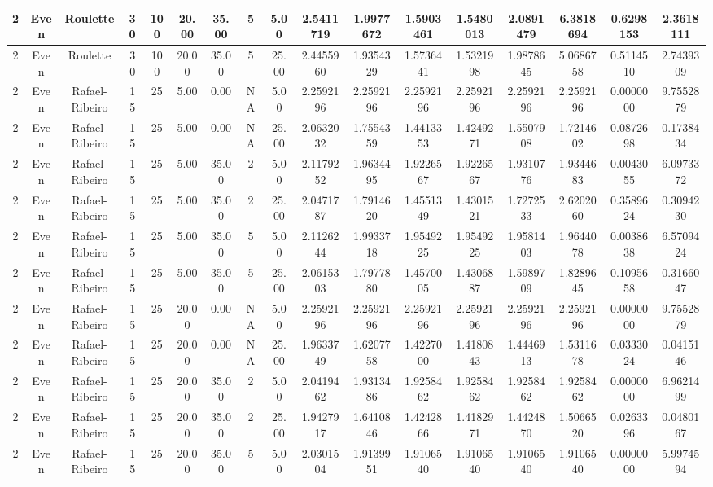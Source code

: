 \begin{longtable}{ | c | c | c | c | c | c | c | c | c | c | c | c | c | c | c | c | c | }
	\hline
	2	&	Even	&	Roulette	&	30	&	100	&	20.00	&	35.00	&	5	&	5.00	&	2.5411719	&	1.9977672	&	1.5903461	&	1.5480013	&	2.0891479	&	6.3818694	&	0.6298153	&	2.3618111 \\
	\hline
	2	&	Even	&	Roulette	&	30	&	100	&	20.00	&	35.00	&	5	&	25.00	&	2.4455960	&	1.9354329	&	1.5736441	&	1.5321998	&	1.9878645	&	5.0686758	&	0.5114510	&	2.7439309 \\
	\hline
	2	&	Even	&	Rafael-Ribeiro	&	15	&	25	&	5.00	&	0.00	&	NA	&	5.00	&	2.2592196	&	2.2592196	&	2.2592196	&	2.2592196	&	2.2592196	&	2.2592196	&	0.0000000	&	9.7552879 \\
	\hline
	2	&	Even	&	Rafael-Ribeiro	&	15	&	25	&	5.00	&	0.00	&	NA	&	25.00	&	2.0632032	&	1.7554359	&	1.4413353	&	1.4249271	&	1.5507908	&	1.7214602	&	0.0872698	&	0.1738434 \\
	\hline
	2	&	Even	&	Rafael-Ribeiro	&	15	&	25	&	5.00	&	35.00	&	2	&	5.00	&	2.1179252	&	1.9634495	&	1.9226567	&	1.9226567	&	1.9310776	&	1.9344683	&	0.0043055	&	6.0973372 \\
	\hline
	2	&	Even	&	Rafael-Ribeiro	&	15	&	25	&	5.00	&	35.00	&	2	&	25.00	&	2.0471787	&	1.7914620	&	1.4551349	&	1.4301521	&	1.7272533	&	2.6202060	&	0.3589624	&	0.3094230 \\
	\hline
	2	&	Even	&	Rafael-Ribeiro	&	15	&	25	&	5.00	&	35.00	&	5	&	5.00	&	2.1126244	&	1.9933718	&	1.9549225	&	1.9549225	&	1.9581403	&	1.9644078	&	0.0038638	&	6.5709424 \\
	\hline
	2	&	Even	&	Rafael-Ribeiro	&	15	&	25	&	5.00	&	35.00	&	5	&	25.00	&	2.0615303	&	1.7977880	&	1.4570005	&	1.4306887	&	1.5989709	&	1.8289645	&	0.1095658	&	0.3166047 \\
	\hline
	2	&	Even	&	Rafael-Ribeiro	&	15	&	25	&	20.00	&	0.00	&	NA	&	5.00	&	2.2592196	&	2.2592196	&	2.2592196	&	2.2592196	&	2.2592196	&	2.2592196	&	0.0000000	&	9.7552879 \\
	\hline
	2	&	Even	&	Rafael-Ribeiro	&	15	&	25	&	20.00	&	0.00	&	NA	&	25.00	&	1.9633749	&	1.6207758	&	1.4227000	&	1.4180843	&	1.4446913	&	1.5311678	&	0.0333024	&	0.0415146 \\
	\hline
	2	&	Even	&	Rafael-Ribeiro	&	15	&	25	&	20.00	&	35.00	&	2	&	5.00	&	2.0419462	&	1.9313486	&	1.9258462	&	1.9258462	&	1.9258462	&	1.9258462	&	0.0000000	&	6.9621499 \\
	\hline
	2	&	Even	&	Rafael-Ribeiro	&	15	&	25	&	20.00	&	35.00	&	2	&	25.00	&	1.9427917	&	1.6410846	&	1.4242866	&	1.4182971	&	1.4424870	&	1.5066520	&	0.0263396	&	0.0480167 \\
	\hline
	2	&	Even	&	Rafael-Ribeiro	&	15	&	25	&	20.00	&	35.00	&	5	&	5.00	&	2.0301504	&	1.9139951	&	1.9106540	&	1.9106540	&	1.9106540	&	1.9106540	&	0.0000000	&	5.9974594 \\

\end{longtable}
